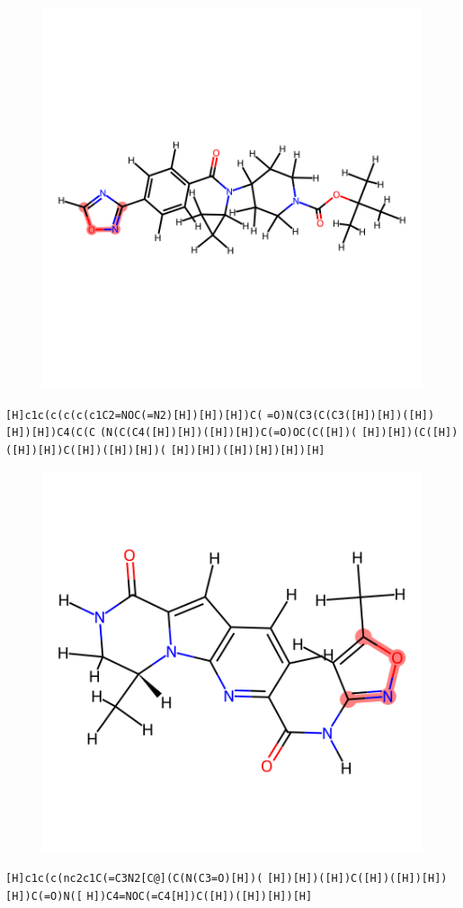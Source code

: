 \documentclass{article}
\begin{document}
\begin{figure}[ht]
\centering
    \includegraphics{mol124.png}
\end{figure}
\verb|[H]c1c(c(c(c(c1C2=NOC(=N2)[H])[H])[H])C(| \verb|=O)N(C3(C(C3([H])[H])([H])[H])[H])C4(C(C| \verb|(N(C(C4([H])[H])([H])[H])C(=O)OC(C([H])(| \verb|[H])[H])(C([H])([H])[H])C([H])([H])[H])(| \verb|[H])[H])([H])[H])[H])[H]|

\begin{figure}[ht]
\centering
    \includegraphics{mol125.png}
\end{figure}
\verb|[H]c1c(c(nc2c1C(=C3N2[C@](C(N(C3=O)[H])(| \verb|[H])[H])([H])C([H])([H])[H])[H])C(=O)N([| \verb|H])C4=NOC(=C4[H])C([H])([H])[H])[H]|
\end{document}
